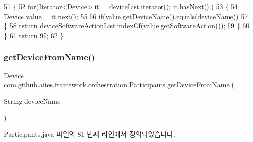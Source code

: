\begin{DoxyCode}
51                                                       \{
52         \textcolor{keywordflow}{for}(Iterator<Device> it = \mbox{\hyperlink{classcom_1_1github_1_1aites_1_1framework_1_1orchestration_1_1_participants_ab90ca1b5cf16aec6e3e6608df4a8d2ad}{deviceList}}.iterator(); it.hasNext();)
53         \{
54             Device value = it.next();
55             
56             \textcolor{keywordflow}{if}(value.getDeviceName().equals(deviceName))
57             \{
58                 \textcolor{keywordflow}{return} \mbox{\hyperlink{classcom_1_1github_1_1aites_1_1framework_1_1orchestration_1_1_participants_ac53ce12002e42b5ed3b6ff38afbbaf01}{deviceSoftwareActionList}}.indexOf(value.getSoftwareAction());
59             \}
60         \}
61         \textcolor{keywordflow}{return} 99;
62     \}
\end{DoxyCode}
\mbox{\label{classcom_1_1github_1_1aites_1_1framework_1_1orchestration_1_1_participants_a9fc55eba9746f4e2fb91158f9c278262}} 
\subsubsection{\texorpdfstring{get\+Device\+From\+Name()}{getDeviceFromName()}}
{\footnotesize\ttfamily \mbox{\hyperlink{classcom_1_1github_1_1aites_1_1framework_1_1orchestration_1_1_device}{Device}} com.\+github.\+aites.\+framework.\+orchestration.\+Participants.\+get\+Device\+From\+Name (\begin{DoxyParamCaption}\item[{String}]{device\+Name }\end{DoxyParamCaption})}



Participants.\+java 파일의 81 번째 라인에서 정의되었습니다.


